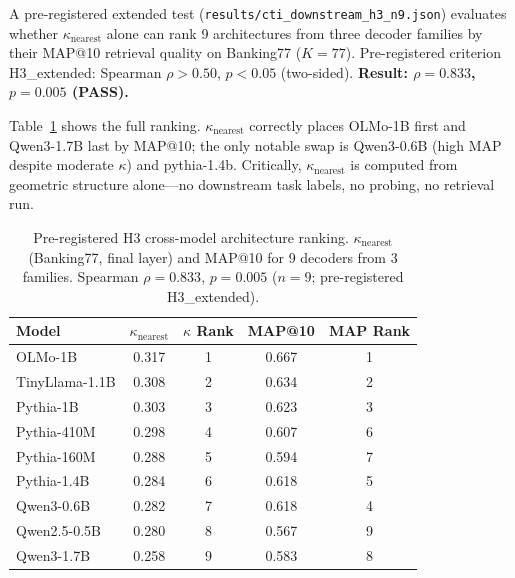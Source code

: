 \documentclass{article}
\begin{document}
A pre-registered extended test (\texttt{results/cti\_downstream\_h3\_n9.json}) evaluates whether $\kappa_\mathrm{nearest}$ alone can rank 9 architectures from three decoder families by their MAP@10 retrieval quality on Banking77 ($K=77$).
Pre-registered criterion H3\_extended: Spearman $\rho>0.50$, $p<0.05$ (two-sided).
\textbf{Result: $\rho=0.833$, $p=0.005$ (PASS).}

Table~\ref{tab:h3-ranking} shows the full ranking.
$\kappa_\mathrm{nearest}$ correctly places OLMo-1B first and Qwen3-1.7B last by MAP@10;
the only notable swap is Qwen3-0.6B (high MAP despite moderate $\kappa$) and pythia-1.4b.
Critically, $\kappa_\mathrm{nearest}$ is computed from geometric structure alone---no downstream task labels, no probing, no retrieval run.

\begin{table}[t]
\centering
\caption{Pre-registered H3 cross-model architecture ranking. $\kappa_\mathrm{nearest}$ (Banking77, final layer) and MAP@10 for 9 decoders from 3 families. Spearman $\rho=0.833$, $p=0.005$ ($n=9$; pre-registered H3\_extended).}
\label{tab:h3-ranking}
\small
\begin{tabular}{lcccc}
\toprule
Model & $\kappa_\mathrm{nearest}$ & $\kappa$ Rank & MAP@10 & MAP Rank \\
\midrule
OLMo-1B       & 0.317 & 1 & 0.667 & 1 \\
TinyLlama-1.1B & 0.308 & 2 & 0.634 & 2 \\
Pythia-1B     & 0.303 & 3 & 0.623 & 3 \\
Pythia-410M   & 0.298 & 4 & 0.607 & 6 \\
Pythia-160M   & 0.288 & 5 & 0.594 & 7 \\
Pythia-1.4B   & 0.284 & 6 & 0.618 & 5 \\
Qwen3-0.6B    & 0.282 & 7 & 0.618 & 4 \\
Qwen2.5-0.5B  & 0.280 & 8 & 0.567 & 9 \\
Qwen3-1.7B    & 0.258 & 9 & 0.583 & 8 \\
\bottomrule
\end{tabular}
\end{table}
\end{document}
